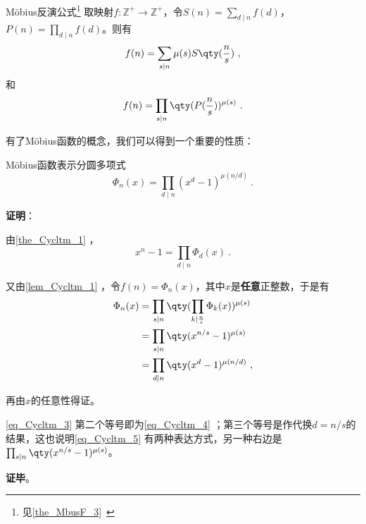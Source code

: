 \begin{lemma}{Möbius反演公式\footnote{见\autoref{the_MbusF_3}~}}\label{lem_Cycltm_1}
取映射$f:\mathbb{Z}^+\to\mathbb{Z}^+$，令$S(n)=\sum_{d\mid n}f(d)$，$P(n)=\prod_{d\mid n}f(d)$。则有
\begin{equation}
f(n) = \sum_{s\mid n}\mu(s)S\qty(\frac{n}{s})~,
\end{equation}
和
\begin{equation}
f(n) = \prod_{s\mid n}\qty(P(\frac{n}{s}))^{\mu(s)}~.
\end{equation}
\end{lemma}






有了Möbius函数的概念，我们可以得到一个重要的性质：



\begin{theorem}{Möbius函数表示分圆多项式}\label{the_Cycltm_4}
\begin{equation}\label{eq_Cycltm_5}
\Phi_n(x) = \prod_{d\mid n}(x^d-1)^{\mu(n/d)}~.
\end{equation}
\end{theorem}


\textbf{证明}：

由\autoref{the_Cycltm_1} ，
\begin{equation}\label{eq_Cycltm_4}
x^n-1 = \prod_{d\mid n}\Phi_d(x)~.
\end{equation}

又由\autoref{lem_Cycltm_1} ，令$f(n)=\Phi_n(x)$，其中$x$是\textbf{任意}正整数，于是有
\begin{equation}\label{eq_Cycltm_3}
\begin{aligned}
\Phi_n(x)&=\prod_{s\mid n}\qty(\prod_{k\mid \frac{n}{s}}\Phi_k(x))^{\mu(s)}\\
&=\prod_{s\mid n}\qty(x^{n/s}-1)^{\mu(s)}\\
&=\prod_{d\mid n}\qty(x^{d}-1)^{\mu(n/d)}~,
\end{aligned}
\end{equation}

再由$x$的任意性得证。

\autoref{eq_Cycltm_3} 第二个等号即为\autoref{eq_Cycltm_4} ；第三个等号是作代换$d=n/s$的结果，这也说明\autoref{eq_Cycltm_5} 有两种表达方式，另一种右边是$\prod_{s\mid n}\qty(x^{n/s}-1)^{\mu(s)}$。

\textbf{证毕}。











